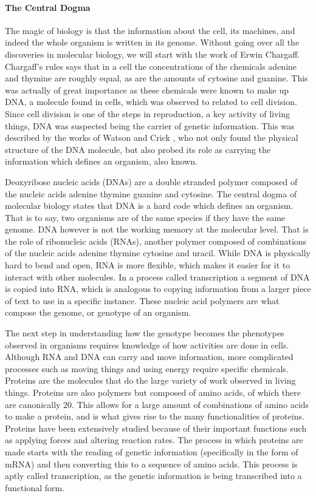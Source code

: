 \documentclass{article}
\begin{document}
\paragraph{The Central Dogma}

The magic of biology is that the information about the cell, its machines, and indeed the whole organism is written in its genome. Without going over all the discoveries in molecular biology, we will start with the work of Erwin Chargaff. Chargaff's rules says that in a cell the concentrations of the chemicals adenine and thymine are roughly equal, as are the amounts of cytosine and guanine. This was actually of great importance as these chemicals were known to make up DNA, a molecule found in cells, which was observed to related to cell division. Since cell division is one of the steps in reproduction, a key activity of living things, DNA was suspected being the carrier of genetic information. This was described by the works of Watson and Crick , who not only found the physical structure of the DNA molecule, but also probed its role as carrying the information which defines an organism, also known.

Deoxyribose nucleic acids (DNAs) are a double stranded polymer composed of the nucleic acids adenine thymine guanine and cytosine. The central dogma of molecular biology states that DNA is a hard code which defines an organism. That is to say, two organisms are of the same species if they have the same genome. DNA however is not the working memory at the molecular level. That is the role of ribonucleic acids (RNAs), another polymer composed of combinations of the nucleic acids adenine thymine cytosine and uracil. While DNA is physically hard to bend and open, RNA is more flexible, which makes it easier for it to interact with other molecules. In a process called transcription a segment of DNA is copied into RNA, which is analogous to copying information from a larger piece of text to use in a specific instance. These nucleic acid polymers are what compose the genome, or genotype of an organism.

The next step in understanding how the genotype becomes the phenotypes observed in organisms requires knowledge of how activities are done in cells. Although RNA and DNA can carry and move information, more complicated processes such as moving things and using energy require specific chemicals. Proteins are the molecules that do the large variety of work observed in living things. Proteins are also polymers but composed of amino acids, of which there are canonically 20. This allows for a large amount of combinations of amino acids to make a protein, and is what gives rise to the many functionalities of proteins. Proteins have been extensively studied because of their important functions such as applying forces and altering reaction rates. The process in which proteins are made starts with the reading of genetic information (specifically in the form of mRNA) and then converting this to a sequence of amino acids. This process is aptly called transcription, as the genetic information is being transcribed into a functional form.
\end{document}
